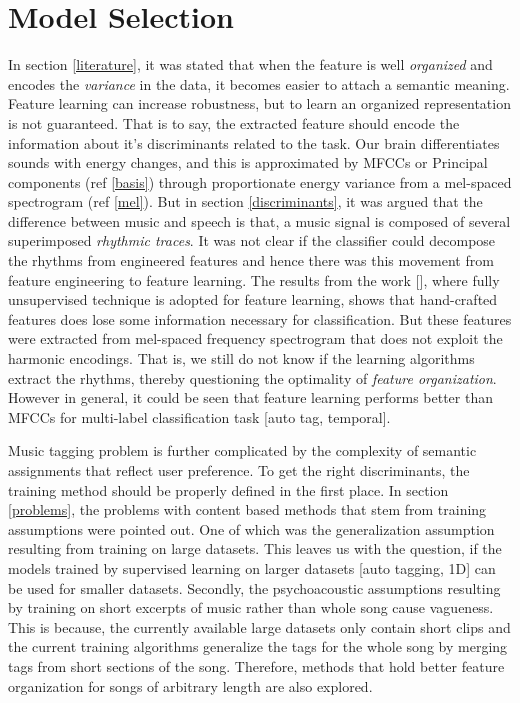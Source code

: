 \section{Model Selection}
\label{model}
In section \ref{literature}, it was stated that when the feature is well \textit{organized} and encodes the \textit{variance} in the data, it becomes easier to attach a semantic meaning. Feature learning can increase robustness, but to learn an organized representation is not guaranteed. That is to say, the extracted feature should encode the information about it's discriminants  related to the task. Our brain differentiates sounds with energy changes, and this is approximated by MFCCs or Principal components (ref \ref{basis}) through proportionate energy variance from a mel-spaced spectrogram (ref \ref{mel}). But in section \ref{discriminants}, it was argued that the difference between music and speech is that, a music signal is composed of several superimposed \textit{rhythmic traces}. It was not clear if the classifier could decompose the rhythms from engineered features and hence there was this movement from feature engineering to feature learning. The results from the work [], where fully unsupervised technique is adopted for feature learning, shows that hand-crafted features does lose some information necessary for classification. But these features were extracted from mel-spaced frequency spectrogram that does not exploit the harmonic encodings. That is, we still do not know if the learning algorithms extract the rhythms, thereby questioning the optimality of \textit{feature organization}. However in general, it could be seen that feature learning performs better than MFCCs for multi-label classification task [auto tag, temporal].   
\bigskip

\noindent Music tagging problem is further complicated by the complexity of semantic assignments that reflect user preference. To get the right discriminants, the training method should be properly defined in the first place. In section \ref{problems}, the problems with content based methods that stem from training assumptions were pointed out. One of which was the generalization assumption resulting from training on large datasets. This leaves us with the question, if the models trained by supervised learning on larger datasets [auto tagging, 1D] can be used for smaller datasets. Secondly, the psychoacoustic assumptions resulting by training on short excerpts of music rather than whole song cause  vagueness. This is because, the currently available large datasets only contain short clips and the current training algorithms generalize the tags for the whole song by merging tags from short sections of the song. Therefore, methods that hold better feature organization for songs of arbitrary length are also explored.   

